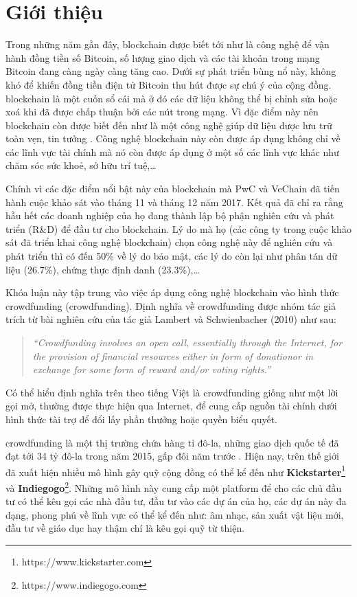 \documentclass[../main-report.tex]{subfiles}
\begin{document}
\section{Giới thiệu}
Trong những năm gần đây, \Gls{blockchain} được biết tới như là công nghệ để vận hành đồng tiền số Bitcoin, số lượng giao dịch và các tài khoản trong mạng Bitcoin đang càng ngày càng tăng cao. Dưới sự phát triển bùng nổ này, không khó để khiến đồng tiền điện tử Bitcoin thu hút được sự chú ý của cộng đồng. \Gls{blockchain} là một cuốn sổ cái mà ở đó các dữ liệu không thể bị chỉnh sửa hoặc xoá khi đã được chấp thuận bởi các nút trong mạng. Vì đặc điểm này nên \gls{blockchain} còn được biết đến như là một công nghệ giúp dữ liệu được lưu trữ toàn vẹn, tin tưởng \cite{yli2016current}. Công nghệ \gls{blockchain} này còn được áp dụng không chỉ về các lĩnh vực tài chính mà nó còn được áp dụng ở một số các lĩnh vực khác như chăm sóc sức khoẻ, sở hữu trí tuệ,\ldots

Chính vì các đặc điểm nổi bật này của \gls{blockchain} mà PwC và VeChain đã tiến hành cuộc khảo sát vào tháng 11 và tháng 12 năm 2017. Kết quả đã chỉ ra rằng hầu hết các doanh nghiệp của họ đang thành lập bộ phận nghiên cứu và phát triển (R\&D) để đầu tư cho \gls{blockchain}. Lý do mà họ (các công ty trong cuộc khảo sát đã triển khai công nghệ \gls{blockchain}) chọn công nghệ này để nghiên cứu và phát triển thì có đến 50\% về lý do bảo mật, các lý do còn lại như phân tán dữ liệu (26.7\%), chứng thực định danh (23.3\%),\ldots

Khóa luận này tập trung vào việc áp dụng công nghệ \gls{blockchain} vào hình thức \glsdesc{crowdfunding} (\Gls{crowdfunding}). Định nghĩa về \gls{crowdfunding} được nhóm tác giả trích từ bài nghiên cứu của tác giả Lambert và Schwienbacher (2010) như sau:

\begin{quote}
\textit{``Crowdfunding  involves  an  open  call,  essentially  through  the Internet, for the provision of financial resources either in form of donationor in exchange for some form of reward and/or voting rights.''} \cite{belleflamme2010crowdfunding}
\end{quote}

Có thể hiểu định nghĩa trên theo tiếng Việt là \gls{crowdfunding} giống như một lời gọi mở, thường được thực hiện qua Internet, để cung cấp nguồn tài chính dưới hình thức tài trợ để đổi lấy phần thưởng hoặc quyền biểu quyết.

\Gls{crowdfunding} là một thị trường chứa hàng tỉ đô-la, những giao dịch quốc tế đã đạt tới 34 tỷ đô-la trong năm 2015, gấp đôi năm trước \cite{hornuf2018economics}. Hiện nay, trên thế giới đã xuất hiện nhiều mô hình gây quỹ cộng đồng có thể kể đến như \textbf{Kickstarter}\footnote{https://www.kickstarter.com} và \textbf{Indiegogo}\footnote{https://www.indiegogo.com}. Những mô hình này cung cấp một platform để cho các chủ đầu tư có thể kêu gọi các nhà đầu tư, đầu tư vào các dự án của họ, các dự án này đa dạng, phong phú về lĩnh vực có thể kể đến như: âm nhạc, sản xuất vật liệu mới, đầu tư về giáo dục hay thậm chí là kêu gọi quỹ từ thiện.
\end{document}
